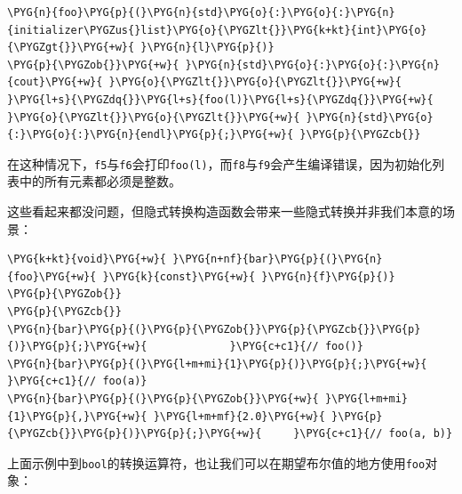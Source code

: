 
\begin{codeblockbg}
\begin{Verbatim}[commandchars=\\\{\},breaklines=true,breakanywhere=true,fontsize=\codefont,xleftmargin=17bp]
\PYG{n}{foo}\PYG{p}{(}\PYG{n}{std}\PYG{o}{:}\PYG{o}{:}\PYG{n}{initializer\PYGZus{}list}\PYG{o}{\PYGZlt{}}\PYG{k+kt}{int}\PYG{o}{\PYGZgt{}}\PYG{+w}{ }\PYG{n}{l}\PYG{p}{)}
\PYG{p}{\PYGZob{}}\PYG{+w}{ }\PYG{n}{std}\PYG{o}{:}\PYG{o}{:}\PYG{n}{cout}\PYG{+w}{ }\PYG{o}{\PYGZlt{}}\PYG{o}{\PYGZlt{}}\PYG{+w}{ }\PYG{l+s}{\PYGZdq{}}\PYG{l+s}{foo(l)}\PYG{l+s}{\PYGZdq{}}\PYG{+w}{ }\PYG{o}{\PYGZlt{}}\PYG{o}{\PYGZlt{}}\PYG{+w}{ }\PYG{n}{std}\PYG{o}{:}\PYG{o}{:}\PYG{n}{endl}\PYG{p}{;}\PYG{+w}{ }\PYG{p}{\PYGZcb{}}
\end{Verbatim}
\end{codeblockbg}



在这种情况下，\texttt{f5}与\texttt{f6}会打印\texttt{foo(\allowbreak{}l)}，而\texttt{f8}与\texttt{f9}会产生编译错误，因为初始化列表中的所有元素都必须是整数。



这些看起来都没问题，但隐式转换构造函数会带来一些隐式转换并非我们本意的场景：



\begin{codeblockbg}
\begin{Verbatim}[commandchars=\\\{\},breaklines=true,breakanywhere=true,fontsize=\codefont,xleftmargin=17bp]
\PYG{k+kt}{void}\PYG{+w}{ }\PYG{n+nf}{bar}\PYG{p}{(}\PYG{n}{foo}\PYG{+w}{ }\PYG{k}{const}\PYG{+w}{ }\PYG{n}{f}\PYG{p}{)}
\PYG{p}{\PYGZob{}}
\PYG{p}{\PYGZcb{}}
\PYG{n}{bar}\PYG{p}{(}\PYG{p}{\PYGZob{}}\PYG{p}{\PYGZcb{}}\PYG{p}{)}\PYG{p}{;}\PYG{+w}{             }\PYG{c+c1}{// foo()}
\PYG{n}{bar}\PYG{p}{(}\PYG{l+m+mi}{1}\PYG{p}{)}\PYG{p}{;}\PYG{+w}{              }\PYG{c+c1}{// foo(a)}
\PYG{n}{bar}\PYG{p}{(}\PYG{p}{\PYGZob{}}\PYG{+w}{ }\PYG{l+m+mi}{1}\PYG{p}{,}\PYG{+w}{ }\PYG{l+m+mf}{2.0}\PYG{+w}{ }\PYG{p}{\PYGZcb{}}\PYG{p}{)}\PYG{p}{;}\PYG{+w}{     }\PYG{c+c1}{// foo(a, b)}
\end{Verbatim}
\end{codeblockbg}



上面示例中到\texttt{bool}的转换运算符，也让我们可以在期望布尔值的地方使用\texttt{foo}对象：


